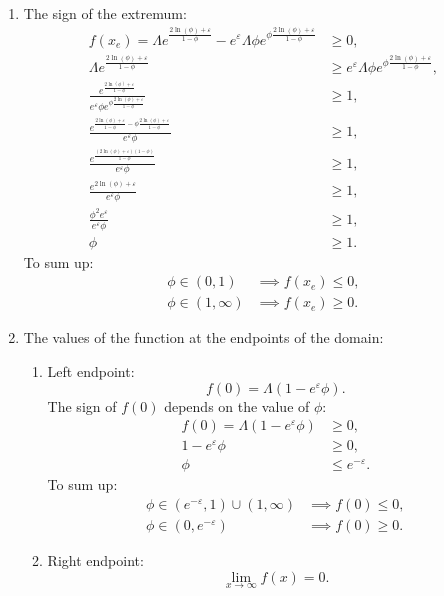 \begin{enumerate}[label=\arabic*.]
\item The sign of the extremum:
\begin{align*}
f(x_e) = \Lambda e^{\frac{2\ln(\phi)+\varepsilon}{1-\phi}} - e^{\varepsilon} \Lambda\phi e^{\phi\frac{2\ln(\phi)+\varepsilon}{1-\phi}} &\geq 0, \\
\Lambda e^{\frac{2\ln(\phi)+\varepsilon}{1-\phi}} &\geq e^{\varepsilon} \Lambda\phi e^{\phi\frac{2\ln(\phi)+\varepsilon}{1-\phi}}, \\
\frac{e^{\frac{2\ln(\phi)+\varepsilon}{1-\phi}}}{e^{\varepsilon} \phi e^{\phi\frac{2\ln(\phi)+\varepsilon}{1-\phi}}} &\geq 1, \\
\frac{e^{\frac{2\ln(\phi)+\varepsilon}{1-\phi} - \phi\frac{2\ln(\phi)+\varepsilon}{1-\phi}}}{e^{\varepsilon} \phi} &\geq 1, \\
\frac{e^{\frac{(2\ln(\phi)+\varepsilon)(1-\phi)}{1-\phi}}}{e^{\varepsilon} \phi} &\geq 1, \\
\frac{e^{2\ln(\phi)+\varepsilon}}{e^{\varepsilon} \phi} &\geq 1, \\
\frac{\phi^2 e^{\varepsilon}}{e^{\varepsilon} \phi} &\geq 1, \\
\phi &\geq 1.
\end{align*}
To sum up:
\begin{align*}
\phi \in (0, 1) &\implies f(x_e) \leq 0, \\
\phi \in (1, \infty) &\implies f(x_e) \geq 0.
\end{align*}

\item The values of the function at the endpoints of the domain:
\begin{enumerate}[label=(\alph*)]
  \item Left endpoint:
  \[
  f(0) = \Lambda(1 - e^{\varepsilon}\phi).
  \]
  The sign of $f(0)$ depends on the value of $\phi$:
  \begin{align*}
  f(0) = \Lambda(1 - e^{\varepsilon}\phi) &\geq 0, \\
  1 - e^{\varepsilon}\phi &\geq 0, \\
  \phi &\leq e^{-\varepsilon}.
  \end{align*}
  To sum up:
  \begin{align*}
  \phi \in (e^{-\varepsilon}, 1) \cup (1, \infty) &\implies f(0) \leq 0, \\
  \phi \in (0, e^{-\varepsilon}) &\implies f(0) \geq 0.
  \end{align*}
  \item Right endpoint:
  \[
  \lim_{x \to \infty} f(x) = 0.
  \]
\end{enumerate}


\end{enumerate}
